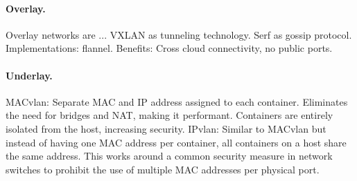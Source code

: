 \paragraph{Overlay.} 
Overlay networks \cite{tarkoma2010overlay} are ...
VXLAN as tunneling technology.
Serf as gossip protocol.
Implementations: flannel.
Benefits: Cross cloud connectivity, no public ports.

\paragraph{Underlay.}
MACvlan: Separate MAC and IP address assigned to each container. Eliminates the need for bridges and NAT, making it performant. Containers are entirely isolated from the host, increasing security.
IPvlan: Similar to MACvlan but instead of having one MAC address per container, all containers on a host share the same address. This works around a common security measure in network switches to prohibit the use of multiple MAC addresses per physical port.
